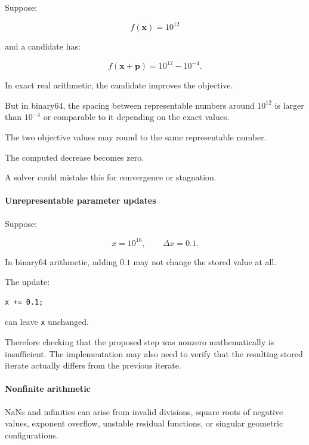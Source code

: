 \hypertarget{02-foundations-ii-ch027-catastrophic-cancellation}{}

Suppose:

\[
f(\mathbf x)=10^{12}
\]

and a candidate has:

\[
f(\mathbf x+\mathbf p)=10^{12}-10^{-4}.
\]

In exact real arithmetic, the candidate improves the objective.

But in binary64, the spacing between representable numbers around \(10^{12}\) is larger than \(10^{-4}\) or comparable to it depending on the exact values.

The two objective values may round to the same representable number.

The computed decrease becomes zero.

A solver could mistake this for convergence or stagnation.

\paragraph{Unrepresentable parameter updates}\label{02-foundations-ii-ch027-unrepresentable-parameter-updates}

\hypertarget{02-foundations-ii-ch027-unrepresentable-parameter-updates}{}

Suppose:

\[
x=10^{16}, \qquad \Delta x=0.1.
\]

In binary64 arithmetic, adding \(0.1\) may not change the stored value at all.

The update:

\begin{verbatim}
x += 0.1;
\end{verbatim}

can leave \texttt{x} unchanged.

Therefore checking that the proposed step was nonzero mathematically is insufficient. The implementation may also need to verify that the resulting stored iterate actually differs from the previous iterate.

\paragraph{Nonfinite arithmetic}\label{02-foundations-ii-ch027-nonfinite-arithmetic}

\hypertarget{02-foundations-ii-ch027-nonfinite-arithmetic}{}

NaNs and infinities can arise from invalid divisions, square roots of negative values, exponent overflow, unstable residual functions, or singular geometric configurations.

